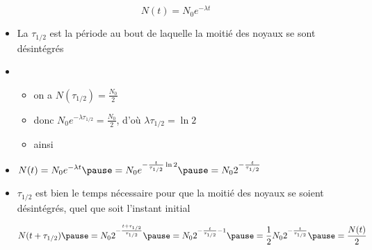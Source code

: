% 
%   
%   
%   
%   
%    
% 


\begin{frame}
$$N(t) = N_0 e^{-\lambda t}$$

\pause
\begin{itemize}
  \item La  $\tau_{1/2}$ 
  est la période au bout de laquelle la moitié des noyaux se
  sont désintégrés
  
  \pause
  \item 
  \begin{itemize}
    \item on a $N(\tau_{1/2}) = \frac{N_0}{2}$
    \pause
    \item donc $N_0 e^{ -\lambda \tau_{1/2} } =   \frac{N_0}{2}$, d'où 
  $\lambda \tau_{1/2} = \ln 2$ 
    \pause
   \item ainsi %
    
  \end{itemize}
  
  \pause
  \item $\displaystyle N(t) = N_0 e^{-\lambda t} %
  \pause =  N_0 e^{-\frac{t}{\tau_{1/2}} \ln 2} 
  \pause = N_0 2^{-\frac{t}{\tau_{1/2}}}$
 \pause
  \item $\tau_{1/ 2}$ est bien le
    temps nécessaire pour que la moitié des noyaux se
  soient désintégrés, quel que soit l'instant initial 
  
  \pause
  \vspace*{-4ex}
  $$N(t+\tau_{1/ 2}) 
  \pause = N_0 2^{-\frac{t+\tau_{1/2}}{\tau_{1/2}}}
  \pause = N_0 2^{-\frac{t}{\tau_{1/2}}-1} 
  \pause = \frac12 N_0 2^{-\frac{t}{\tau_{1/2}}}
  \pause = \frac{N(t)}{2}$$
  
\end{itemize}
 
          
      

\end{frame}



